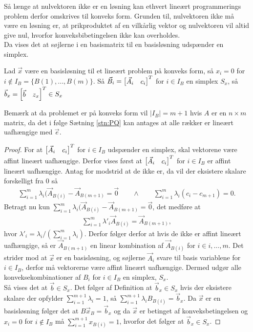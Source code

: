 Så længe at nulvektoren ikke er en løsning kan ethvert lineært programmerings problem derfor omskrives til konveks form.
Grunden til, nulvektoren ikke må være en løsning er, at prikproduktet af en vilkårlig vektor og nulvektoren vil altid give nul, hvorfor konveksbibetingelsen ikke kan overholdes.
\\Da vises det at søjlerne i en basismatrix til en basisløsning udspænder en simplex.
\begin{stn}
Lad $\vec{x}$ være en basisløsning til et lineært problem på konveks form, så $x_i = 0$ for $i \notin I_B = \{B(1),..., B(m)\}$.
 Så  $\vec{B}_i  = \begin{bmatrix} \vec{A}_i & c_i \end{bmatrix}^T$ for $i \in I_B$ en simplex $S_x$, så $\vec{b}_x = \begin{bmatrix} \vec{b}& z_x \end{bmatrix}^T \in S_x$
\end{stn}
Bemærk at da problemet er på konveks form vil $|I_B| = m+1$ hvis $A$ er en $n\times m$ matrix, da det i følge Sætning \ref{stn:PQ}
kan antages at alle rækker er lineært uafhængige med $\vec{e}$.
\begin{proof}
For at $\begin{bmatrix} \vec{A}_i & c_i \end{bmatrix}^T$ for $i \in I_B$ udspænder en simplex, skal vektorene være affint lineært uafhængige.
Derfor vises først at $\begin{bmatrix} \vec{A}_i & c_i \end{bmatrix}^T$ for $i \in I_B$ er affint lineært uafhængige.
Antag for modstrid at de ikke er, da vil der eksistere skalare forskelligt fra $0$ så
\begin{align*}
\sum_{i = 1}^{m} \lambda_i (\vec{A}_{B(i)} - \vec{A}_{B(m+1)} =  \vec{0} \qquad \wedge \qquad \sum_{i=1}^{m} \lambda_i (c_i - c_{m+1})= 0.
\end{align*}
Betragt nu kun $\sum_{i = 1}^{m} \lambda_i (\vec{A}_{B(i)} - \vec{A}_{B(m+1)} =  \vec{0}$, det medføre at
\begin{align*}
\sum_{i = 1}^{m} \lambda'_i \vec{A}_{B(i)} = \vec{A}_{B(m+1)},
\end{align*}
hvor $\lambda'_i = \lambda_i/(\sum_{i=1}^m \lambda_i)$.
Derfor følger derfor at hvis de ikke er affint lineært uafhængige, så er $\vec{A}_{B(m+1)}$ en linear kombination af $\vec{A}_{B(i)}$ for $i  \in i,..., m$.
Det strider mod at $\vec{x}$ er en basisløsning, og søjlerne $\vec{A}_i$ svare til basis variablene for $i \in I_B$, derfor må vektorerne være affint lineært uafhængige. 
Dermed udgør alle konveksekombinationer af $B_i$ for $i \in I_B$ en simplex, $S_x$.
\\ Så vises det at $\vec{b} \in S_x$. 
Det følger af Definition
at $\vec{b}_x\in S_x$ hvis der eksistere skalare der opfylder $\sum_{i=1}^{m+1} \lambda_i = 1$, så $\sum_{i=1}^{m+1}\lambda_i B_{B(i)}  = \vec{b}_x$.
Da $\vec{x}$ er en basisløsning følger det at $B \vec{x}_B = \vec{b}_x$ og da $\vec{x}$ er betinget af konveksbetingelsen og $x_i = 0 $ for $i \notin I_B$ må $\sum_{i=1}^{m+1} x_{B(i)} = 1$, hvorfor det følger at $\vec{b}_x \in S_x$.
\end{proof}

